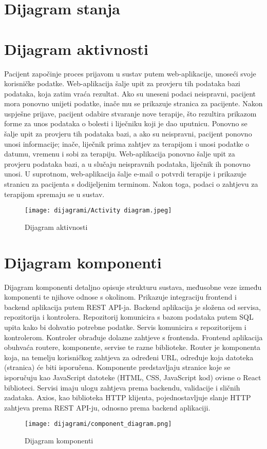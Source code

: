 			\eject
		
		\section{Dijagram stanja}
			
			
			

            
			
			\eject 
		
		\section{Dijagram aktivnosti}
			
			Pacijent započinje proces prijavom u sustav putem web-aplikacije, unoseći svoje korisničke podatke. Web-aplikacija šalje upit za provjeru tih podataka bazi podataka, koja zatim vraća rezultat. Ako su uneseni podaci neispravni, pacijent mora ponovno unijeti podatke, inače mu se prikazuje stranica za pacijente. Nakon uspješne prijave, pacijent odabire stvaranje nove terapije, što rezultira prikazom forme za unos podataka o bolesti i liječniku koji je dao uputnicu. Ponovno se šalje upit za provjeru tih podataka bazi, a ako su neispravni, pacijent ponovno unosi informacije; inače, liječnik prima zahtjev za terapijom i unosi podatke o datumu, vremenu i sobi za terapiju. Web-aplikacija ponovno šalje upit za provjeru podataka bazi, a u slučaju neispravnih podataka, liječnik ih ponovno unosi. U suprotnom, web-aplikacija šalje e-mail o potvrdi terapije i prikazuje stranicu za pacijenta s dodijeljenim terminom. Nakon toga, podaci o zahtjevu za terapijom spremaju se u sustav.
			
			\begin{figure}[H]
				\texttt{[image: dijagrami/Activity diagram.jpeg]}
				\centering
				\caption{Dijagram aktivnosti}
				\label{fig:ActivityDiagram}
			\end{figure}
			
			\eject
		\section{Dijagram komponenti}

            Dijagram komponenti detaljno opisuje strukturu sustava, međusobne veze između komponenti te njihove odnose s okolinom. Prikazuje integraciju frontend i backend aplikacija putem REST API-ja. Backend aplikacija je složena od servisa, repozitorija i kontrolera. Repozitorij komunicira s bazom podataka putem SQL upita kako bi dohvatio potrebne podatke. Servis komunicira s repozitorijem i kontrolerom. Kontroler obrađuje dolazne zahtjeve s frontenda. Frontend aplikacija obuhvaća routere, komponente, servise te razne biblioteke. Router je komponenta koja, na temelju korisničkog zahtjeva za određeni URL, određuje koja datoteka (stranica) će biti isporučena. Komponente predstavljaju stranice koje se isporučuju kao JavaScript datoteke (HTML, CSS, JavaScript kod) ovisne o React biblioteci. Servisi imaju ulogu zahtjeva prema backendu, validacije i sličnih zadataka. Axios, kao biblioteka HTTP klijenta, pojednostavljuje slanje HTTP zahtjeva prema REST API-ju, odnosno prema backend aplikaciji.
    
			    \begin{figure}[H]
			         \texttt{[image: dijagrami/component\_diagram.png]}
			         \centering
			         \caption{Dijagram komponenti}
			         \label{fig:component_diagram}
		        \end{figure}